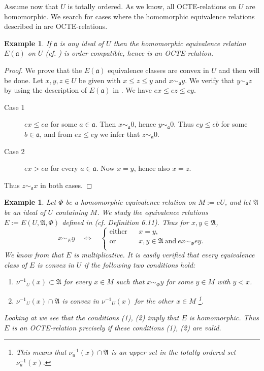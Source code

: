 \documentclass [12pt,a4paper,reqno]{amsart}
\newtheorem{example}[thm]{Example}
\begin{document}
Assume now that $U$ is  totally ordered. As we know,  all
OCTE-relations on $U$ are homomorphic. We  search for cases where
the homomorphic equivalence relations described in \cite[\S5 and
\S6]{IKR2} are OCTE-relations.

\begin{example}\label{examps5.15}
If ${\mathfrak a}$ is any ideal of $U$ then the homomorphic equivalence
relation $E({\mathfrak a})$ on $U$ (cf. \cite[\S5]{IKR2}) is  order
compatible, hence is an OCTE-relation.
\end{example}

\begin{proof}
We prove that the $E({\mathfrak a})$ equivalence classes are convex in $U$
and then will be  done. Let $x,y,z \in U$ be given with $x \leq z
\leq y$ and $x \sim_{\mathfrak a} y$. We verify that $y \sim_{\mathfrak a} z$ by
using the description of $E({\mathfrak a})$ in \cite[Theorem 5.4]{IKR2}. We
have $ex \leq ez \leq ey$.
\begin{description}
    \item[{Case 1}] $ex \leq ea$ for some  $a \in {\mathfrak a}$. Then $x \sim_{\mathfrak a}
    0$, hence $y \sim_{\mathfrak a} 0 $. Thus $ey \leq eb$ for some $b \in {\mathfrak a}$, and from $ez \leq
    ey$ we infer that $z \sim_{\mathfrak a} 0 $.
    \item[{Case 2}] $ex > ea$ for every  $a \in {\mathfrak a}$.
Now $x = y$, hence also $x=z$.
\end{description}
Thus  $z \sim_{\mathfrak a}
    x$ in both cases.
\end{proof}
\begin{example}\label{examps5.16} Let $\Phi$ be a homomorphic equivalence
relation on $M := eU$, and let ${\mathfrak A}$ be an ideal of $U$
containing $M$. We study the equivalence relations $E := E(U,
{\mathfrak A}, \Phi)$ defined in \cite[\S6]{IKR2} (cf. Definition 6.11).
Thus for $x,y \in {\mathfrak A}$,
$$ x \sim_E y  \quad \Leftrightarrow \quad \left\{
\begin{array}{lll}
  \text{either} &  &  x=y, \\[1mm]
  \text{or} &   & x,y \in {\mathfrak A} \ \text{and} \ ex \sim_\Phi ey. \\
\end{array}\right.$$ We know from \cite[Theorem 4.13.i]{IKR2} that $E$ is
multiplicative. It is easily verified that every equivalence class
of $E$ is convex in $U$ if the following two conditions hold:
\begin{enumerate}
    \item ${\nu^{-1}}_U(x) \subset {\mathfrak A}$ for every $x \in M$ such that $x \sim_\Phi
    y$ for some $y\in M $ with $y < x$.
    \item  ${\nu^{-1}}_U(x) \cap {\mathfrak A}$ is convex in ${\nu^{-1}}_U(x)$ for the
    other $x \in M$ \footnote{This means that $\nu_u^{-1} (x) \cap {\mathfrak A} $
    is an upper set in the totally ordered set $\nu^{-1}_u(x)$.}.
\end{enumerate}
Looking at \cite[Theorem 6.14]{IKR2} we see that the conditions
(1), (2) imply that $E$ is homomorphic. Thus $E$ is an
OCTE-relation precisely if these conditions (1), (2) are valid.
\end{example}
\end{document}
